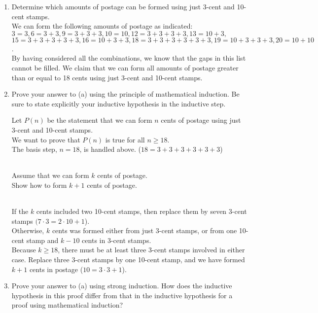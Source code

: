 \documentclass[12pt]{article}  %
\begin{document}
\begin{enumerate}
    \item Determine which amounts of postage can be formed using just 3-cent and 10-cent stamps.\\
    We can form the following amounts of postage as indicated:\\
    $3=3,6=3+3,9=3+3+3,10=10,12=3+3+3+3,13=10+3,$\\
    $15=3+3+3+3+3,16=10+3+3,18=3+3+3+3+3+3,19=10+3+3+3,20=10+10$.\\
    By having considered all the combinations, we know that the gaps in this list cannot be filled. We claim that we can form all amounts of postage greater than or equal to 18 cents using just 3-cent and 10-cent stamps.
    
    \item Prove your answer to (a) using the principle of mathematical induction. Be sure to state explicitly your inductive hypothesis in the inductive step.
    
    \noindent
    Let $P(n)$ be the statement that we can form $n$ cents of postage using just 3-cent and 10-cent stamps.\\
    We want to prove that $P(n)$ is true for all $n\geq18$.\\
    The basis step, $n=18$, is handled above. ($18=3+3+3+3+3+3$)
    
    \\
    Assume that we can form $k$ cents of postage.\\
    Show how to form $k+1$ cents of postage.
    
    \\
    If the $k$ cents included two 10-cent stamps, then replace them by seven 3-cent stamps $(7\cdot3=2\cdot10+1$).\\
    Otherwise, $k$ cents was formed either from just 3-cent stamps, or from one 10-cent stamp and $k-10$ cents in 3-cent stamps.\\
    Because $k\geq18$, there must be at least three 3-cent stamps involved in either case.
    Replace three 3-cent stamps by one 10-cent stamp, and we have formed $k+1$ cents in postage ($10=3\cdot3+1$).
    
    \clearpage
    \item Prove your answer to (a) using strong induction. How does the inductive hypothesis in this proof differ from that in the inductive hypothesis for a proof using mathematical induction?
    

\end{enumerate}
\end{document}
